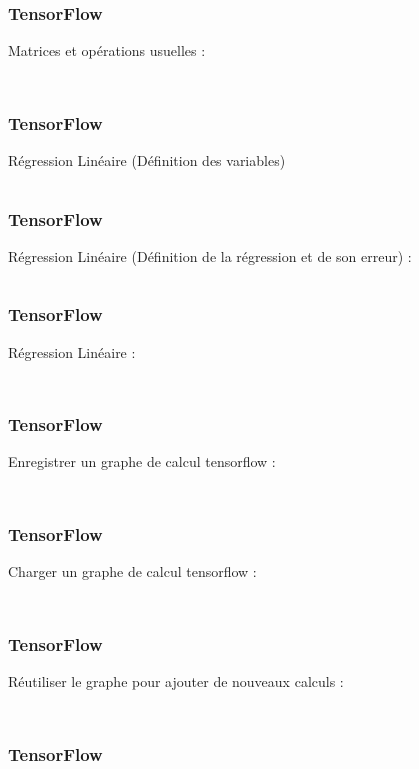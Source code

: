 \documentclass{formation}
\begin{document}
\begin{frame}
  \frametitle{TensorFlow}
  Matrices et opérations usuelles :
  \inputminted[linenos,fontsize=\small,bgcolor=pythonbg]{python}{code-illustration/tf-matrices.py}
  \inputminted[linenos,fontsize=\small,bgcolor=returnbg]{text}{code-illustration/tf-matrices.txt}
\end{frame}

\begin{frame}
  \frametitle{TensorFlow}
  Régression Linéaire (Définition des variables)
  \inputminted[linenos,fontsize=\small,bgcolor=pythonbg]{python}{code-illustration/tf-regression_lineaire-0.py}
\end{frame}

\begin{frame}
  \frametitle{TensorFlow}
  Régression Linéaire (Définition de la régression et de son erreur) :
  \inputminted[linenos,fontsize=\small,bgcolor=pythonbg]{python}{code-illustration/tf-regression_lineaire-1.py}
\end{frame}

\begin{frame}
  \frametitle{TensorFlow}
  Régression Linéaire :
  \inputminted[linenos,fontsize=\small,bgcolor=pythonbg]{python}{code-illustration/tf-regression_lineaire_run.py}
  \inputminted[linenos,fontsize=\small,bgcolor=returnbg]{text}{code-illustration/tf-regression_lineaire_run.txt}
\end{frame}

\begin{frame}
  \frametitle{TensorFlow}
  Enregistrer un graphe de calcul tensorflow :
  \inputminted[linenos,fontsize=\small,bgcolor=pythonbg]{python}{code-illustration/tf-save_models.py}
  \inputminted[linenos,fontsize=\small,bgcolor=returnbg]{text}{code-illustration/tf-save_models.txt}
\end{frame}

\begin{frame}
  \frametitle{TensorFlow}
  Charger un graphe de calcul tensorflow :
  \inputminted[linenos,fontsize=\small,bgcolor=pythonbg]{python}{code-illustration/tf-load_models.py}
  \inputminted[linenos,fontsize=\small,bgcolor=returnbg]{text}{code-illustration/tf-load_models.txt}
\end{frame}

\begin{frame}
  \frametitle{TensorFlow}
  Réutiliser le graphe pour ajouter de nouveaux calculs :
  \inputminted[linenos,fontsize=\small,bgcolor=pythonbg]{python}{code-illustration/tf-modify_models.py}
  \inputminted[linenos,fontsize=\small,bgcolor=returnbg]{text}{code-illustration/tf-modify_models.txt}
\end{frame}

\begin{frame}
  \frametitle{TensorFlow}
\end{frame}
\end{document}
